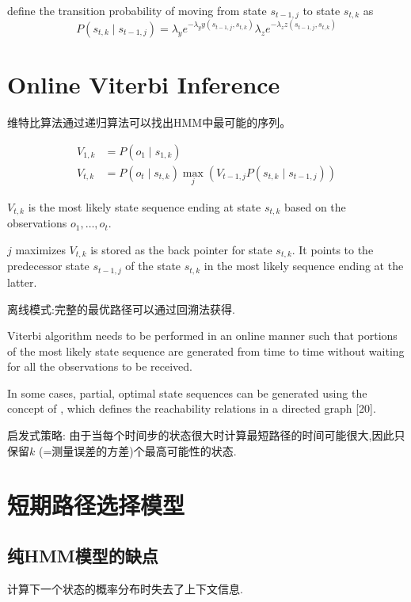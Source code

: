 define the transition probability of moving from state $ s_{t-1, j} $ to state $ s_{t, k} $ as
$$
P\left(s_{t, k} \mid s_{t-1, j}\right)=\lambda_{y} e^{-\lambda_{y} y\left(s_{t-1, j}, s_{t, k}\right)} \lambda_{z} e^{-\lambda_{z} z\left(s_{t-1, j}, s_{t, k}\right)}
$$

\section{Online Viterbi Inference}

维特比算法通过递归算法可以找出HMM中最可能的序列。

$$ \begin{aligned} V_{1, k} &=P\left(o_{1} \mid s_{1, k}\right) \\ V_{t, k} &=P\left(o_{t} \mid s_{t, k}\right) \max _{j}\left(V_{t-1, j} P\left(s_{t, k} \mid s_{t-1, j}\right)\right) \end{aligned} $$

$ V_{t, k} $ is the most likely state sequence ending at state $ s_{t, k} $ based on the observations $ o_{1}, \ldots, o_{t} . $

$j$ maximizes
$V_{t, k}$ is stored as the back pointer for state $s_{t, k}$. It points to the predecessor state $s_{t-1, j}$ of the state $s_{t, k}$ in the most likely sequence ending at the latter.

离线模式:完整的最优路径可以通过回溯法获得.

Viterbi algorithm needs to be performed in
an online manner such that portions of the most likely state
sequence are generated from time to time without waiting for
all the observations to be received.

In some cases, partial,
optimal state sequences can be generated using the concept
of , which defines the reachability relations
in a directed graph [20].

启发式策略: 由于当每个时间步的状态很大时计算最短路径的时间可能很大,因此只保留$k$ (=测量误差的方差)个最高可能性的状态.

\section{短期路径选择模型}

\subsection{纯HMM模型的缺点}

计算下一个状态的概率分布时失去了上下文信息.

